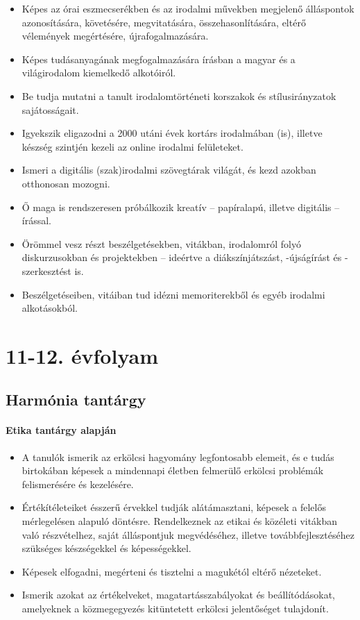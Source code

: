 \begin{itemize}
\item Képes az órai eszmecserékben és az irodalmi művekben megjelenő álláspontok azonosítására, követésére, megvitatására, összehasonlítására, eltérő vélemények megértésére, újrafogalmazására.
\item Képes tudásanyagának megfogalmazására írásban a magyar és a világirodalom kiemelkedő alkotóiról.
\item Be tudja mutatni a tanult irodalomtörténeti korszakok és stílusirányzatok sajátosságait.
\item Igyekszik eligazodni a 2000 utáni évek kortárs irodalmában (is), illetve készség szintjén kezeli az online irodalmi felületeket.
\item Ismeri a digitális (szak)irodalmi szövegtárak világát, és kezd azokban otthonosan mozogni.
\item Ő maga is rendszeresen próbálkozik kreatív – papíralapú, illetve digitális – írással.
\item Örömmel vesz részt beszélgetésekben, vitákban, irodalomról folyó diskurzusokban és projektekben – ideértve a diákszínjátszást, -újságírást és -szerkesztést is.
\item Beszélgetéseiben, vitáiban tud idézni memoriterekből és egyéb irodalmi alkotásokból.
\end{itemize}
\section{11-12. évfolyam}
\subsection{Harmónia tantárgy}
\paragraph{Etika tantárgy alapján}
\begin{itemize}
\item A tanulók ismerik az erkölcsi hagyomány legfontosabb elemeit, és e tudás birtokában képesek a mindennapi életben felmerülő erkölcsi problémák felismerésére és kezelésére.
\item Értékítéleteiket ésszerű érvekkel tudják alátámasztani, képesek a felelős mérlegelésen alapuló döntésre. Rendelkeznek az etikai és közéleti vitákban való részvételhez, saját álláspontjuk megvédéséhez, illetve továbbfejlesztéséhez szükséges készségekkel és képességekkel.
\item Képesek elfogadni, megérteni és tisztelni a magukétól eltérő nézeteket.
\item Ismerik azokat az értékelveket, magatartásszabályokat és beállítódásokat, amelyeknek a közmegegyezés kitüntetett erkölcsi jelentőséget tulajdonít.
\end{itemize}
